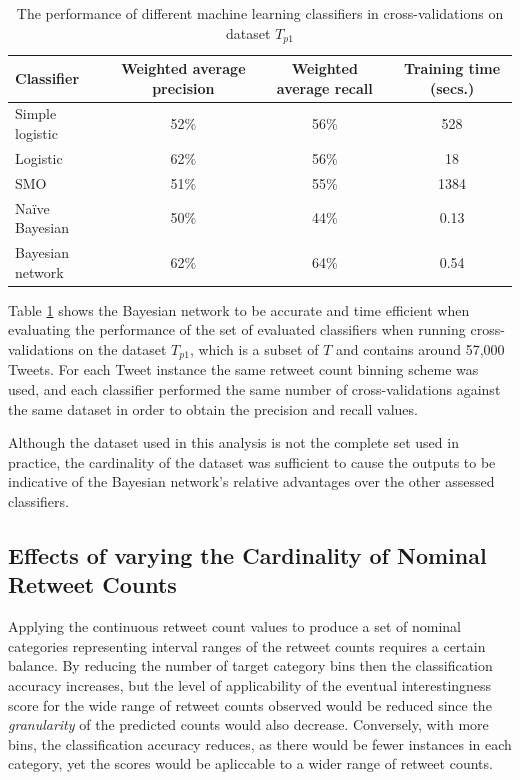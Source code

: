 \begin{table}[h]\footnotesize
\begin{center}
\begin{tabular}{ l | c | c | c }
	Classifier	& Weighted average precision & Weighted average recall &  Training time (secs.) \\
	\hline
	\hline 
	Simple logistic & 52\% &  56\% & 528\\
    Logistic        & 62\% &  56\% & 18\\
    SMO             & 51\% &  55\% & 1384\\
    Na\"{i}ve Bayesian & 50\% & 44\% & 0.13\\
    Bayesian network & 62\%&  64\% & 0.54\\
    \hline  
\end{tabular}
\end{center}
\caption{The performance of different machine learning classifiers in cross-validations on dataset $T_{p1}$}
\label{table:classifierperformance}
\end{table}

Table \ref{table:classifierperformance} shows the Bayesian network to be accurate and time efficient when evaluating the performance of the set of evaluated classifiers when running cross-validations on the dataset $T_{p1}$, which is a subset of $T$ and contains around 57,000 Tweets.  For each Tweet instance the same retweet count binning scheme was used, and each classifier performed the same number of cross-validations against the same dataset in order to obtain the precision and recall values.

Although the dataset used in this analysis is not the complete set used in practice, the cardinality of the dataset was sufficient to cause the outputs to be indicative of the Bayesian network's relative advantages over the other assessed classifiers.


\subsection{Effects of varying the Cardinality of Nominal Retweet Counts}
\label{section:effects_of_varying_bin_sizes}
Applying the continuous retweet count values to produce a set of nominal categories representing interval ranges of the retweet counts requires a certain balance. By reducing the number of target category bins then the classification accuracy increases, but the level of applicability of the eventual interestingness score for the wide range of retweet counts observed would be reduced since the \textit{granularity} of the predicted counts would also decrease. Conversely, with more bins, the classification accuracy reduces, as there would be fewer instances in each category, yet the scores would be apliccable to a wider range of retweet counts.

